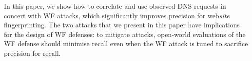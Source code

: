 In this paper, we show how to correlate and use observed DNS requests in
concert with WF attacks,
which significantly
improves precision for web\emph{site} fingerprinting.
The two \name attacks  that we present in this paper have implications
for the design of WF defenses:
to mitigate \name attacks, open-world evaluations of the WF defense should
minimise recall even when the WF attack is tuned to sacrifice precision for
recall.
